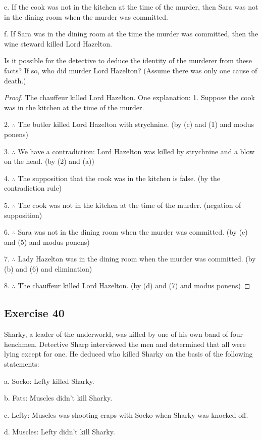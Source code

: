 \documentclass[14pt]{extarticle}
\begin{document}
e. If the cook was not in the kitchen at the time of the murder, then Sara was
not in the dining room when the murder was committed.

f. If Sara was in the dining room at the time the murder was committed, then the
wine steward killed Lord Hazelton.

Is it possible for the detective to deduce the identity of the murderer from
these facts? If so, who did murder Lord Hazelton? (Assume there was only one
cause of death.)

\begin{proof} The chauffeur killed Lord Hazelton. One explanation:
1. Suppose the cook was in the kitchen at the time of the murder.

2. $\therefore$ The butler killed Lord Hazelton with strychnine. (by (c) and (1)
and modus ponens)

3. $\therefore$ We have a contradiction: Lord Hazelton was killed by strychnine
and a blow on the head. (by (2) and (a))

4. $\therefore$ The supposition that the cook was in the kitchen is false. (by
the contradiction rule)

5. $\therefore$ The cook was not in the kitchen at the time of the murder.
(negation of supposition)

6. $\therefore$ Sara was not in the dining room when the murder was committed.
(by (e) and (5) and modus ponens)

7. $\therefore$ Lady Hazelton was in the dining room when the murder was
committed. (by (b) and (6) and elimination)

8. $\therefore$ The chauffeur killed Lord Hazelton. (by (d) and (7) and modus
ponens) \end{proof}

\subsection{Exercise 40} Sharky, a leader of the underworld, was killed by one
of his own band of four henchmen. Detective Sharp interviewed the men and
determined that all were lying except for one. He deduced who killed Sharky on
the basis of the following statements:

a. Socko: Lefty killed Sharky.

b. Fats: Muscles didn’t kill Sharky.

c. Lefty: Muscles was shooting craps with Socko when Sharky was knocked off.

d. Muscles: Lefty didn’t kill Sharky.
\end{document}
